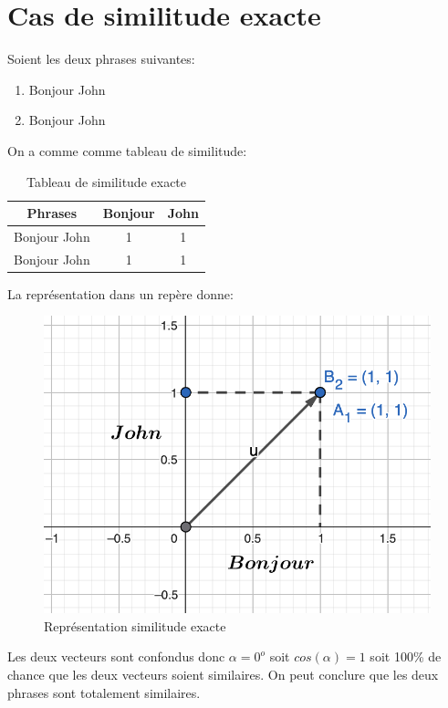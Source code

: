 \documentclass[a4paper, 14pt]{article}
\begin{document}
    \section{Cas de similitude exacte}
    Soient les deux phrases suivantes:
    \begin{enumerate}
    	\item Bonjour John
    	\item Bonjour John
    \end{enumerate}
    On a comme comme tableau de similitude:
    \begin{table}[H]
    	\centering
    	\begin{tabular}{|c|c|c|}
    		\hline
    		\textbf{Phrases} & \textbf{Bonjour} & \textbf{John} \\
    		\hline
    		Bonjour John & 1 & 1 \\
    		Bonjour John  & 1 & 1 \\
    		\hline
    	\end{tabular}
    	\caption{Tableau de similitude exacte}
    	\label{tab:similariteexacte}
    \end{table}
    \newpage
    La représentation dans un repère donne:
    \begin{figure}[H]
    	\includegraphics[scale=0.5, width=15cm]{./img/vecteur_similitude_exacte.png}
    	\caption{Représentation similitude exacte}
    \end{figure}
    Les deux vecteurs sont confondus donc $\alpha = 0^{o}$ soit $cos(\alpha)=1$ soit 100\% de chance que les deux vecteurs soient similaires. On peut conclure que les deux phrases sont totalement similaires.
\end{document}
